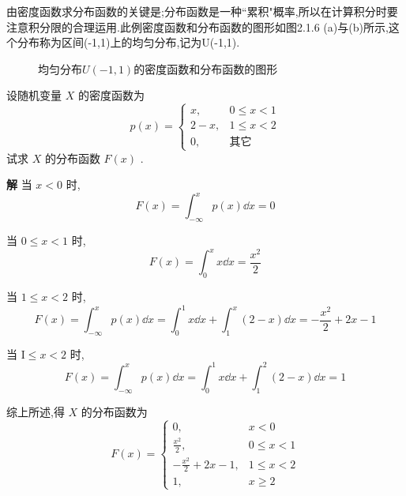 由密度函数求分布函数的关键是;分布函数是一种``累积"概率,所以在计算积分时要注意积分限的合理运用.此例密度函数和分布函数的图形如图2.1.6
(a)与(b)所示,这个分布称为区间(-1,1)上的均匀分布,记为U(-1,1).

\begin{figure}
    \centering
    \hspace{2cm}
    \caption{均匀分布$U(-1,1)$的密度函数和分布函数的图形}\label{fig:2.1.6}
\end{figure}

\begin{example}\label{exam:2.1.8}
	设随机变量 $ X $ 的密度函数为
	\[ 
	p(x)=\left\{\begin{array}{ll}{x,} & {0 \leqslant x<1} \\ {2-x,} & {1 \leqslant x<2} \\ {0,} & {\text{其它}}\end{array}\right.
	\]
	试求 $ X $ 的分布函数 $ F(x) $ .
	
	\textbf{解} 当 $ x<0 $ 时,
	\[ 
	F(x)=\int_{-\infty}^{x} p(x) \dd x=0
	\]
	
	当 $ 0 \leqslant x<1 $ 时,
	\[ 
	F(x)=\int_{0}^{x} x \dd x=\frac{x^{2}}{2}
	\]
	
	当 $ 1 \leqslant x<2 $ 时,
	\[ 
	F(x)=\int_{-\infty}^{x} p(x) \dd x=\int_{0}^{1} x \dd x+\int_{1}^{x}(2-x) \dd x=-\frac{x^{2}}{2}+2 x-1
	\]
	
	当 $ \mathrm{I} \leqslant x<2 $ 时,
	\[ 
	F(x)=\int_{-\infty}^{x} p(x) \dd x=\int_{0}^{1} x \dd x+\int_{1}^{2}(2-x) \dd x=1
	\]
	
	综上所述,得 $ X $ 的分布函数为
	\[ 
	F(x)=\left\{\begin{array}{ll}
	{0,} & {x<0} \\ 
	{\frac{x^{2}}{2},} & {0 \leqslant x<1} \\ 
	{-\frac{x^{2}}{2}+2 x-1,} & {1 \leqslant x<2} \\ 
	{1,} & {x \geqslant 2}
	\end{array}\right.
	\]
\end{example}

